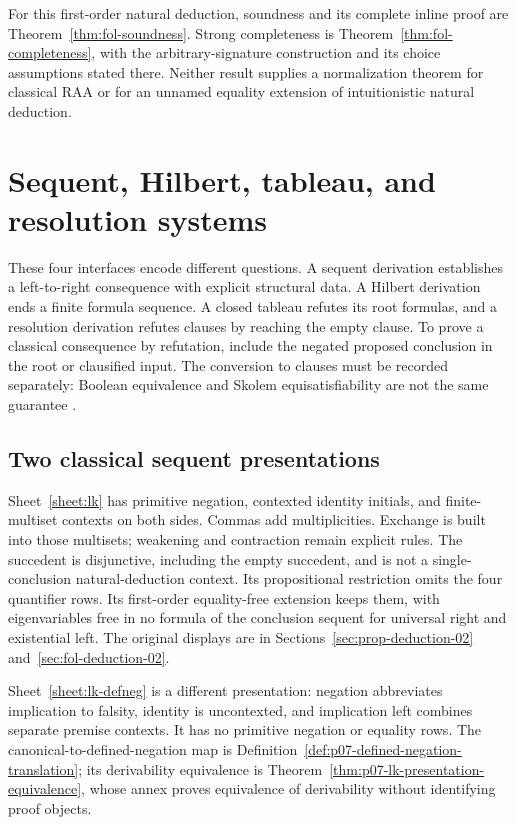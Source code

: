 
For this first-order natural deduction, soundness and its complete inline
proof are Theorem~\ref{thm:fol-soundness}.  Strong completeness is
Theorem~\ref{thm:fol-completeness}, with the arbitrary-signature construction
and its choice assumptions stated there.  Neither result supplies a
normalization theorem for classical RAA or for an unnamed equality
extension of intuitionistic natural deduction.

\section{Sequent, Hilbert, tableau, and resolution systems}
\label{sec:p14-classical-calculi-proof-systems}

These four interfaces encode different questions.  A sequent derivation
establishes a left-to-right consequence with explicit structural data.
A Hilbert derivation ends a finite formula sequence.  A closed tableau
refutes its root formulas, and a resolution derivation refutes clauses by
reaching the empty clause.  To prove a classical consequence by refutation,
include the negated proposed conclusion in the root or clausified input.
The conversion to clauses must be recorded separately: Boolean equivalence
and Skolem equisatisfiability are not the same guarantee
\cite{Smullyan1968,Robinson1965,BachmairGanzinger2001}.

\subsection{Two classical sequent presentations}

Sheet~\ref{sheet:lk} has primitive negation, contexted identity initials,
and finite-multiset contexts on both sides.  Commas add multiplicities.
Exchange is built into those multisets; weakening and contraction remain
explicit rules.  The succedent is disjunctive, including the empty
succedent, and is not a single-conclusion natural-deduction context.
Its propositional restriction omits the four quantifier rows.  Its
first-order equality-free extension keeps them, with eigenvariables free
in no formula of the conclusion sequent for universal right and
existential left.  The original displays are in
Sections~\ref{sec:prop-deduction-02} and~\ref{sec:fol-deduction-02}.


Sheet~\ref{sheet:lk-defneg} is a different presentation: negation
abbreviates implication to falsity, identity is uncontexted, and
implication left combines separate premise contexts.  It has no primitive
negation or equality rows.  The canonical-to-defined-negation map is
Definition~\ref{def:p07-defined-negation-translation}; its derivability
equivalence is Theorem~\ref{thm:p07-lk-presentation-equivalence}, whose
annex proves equivalence of derivability without identifying proof objects.

